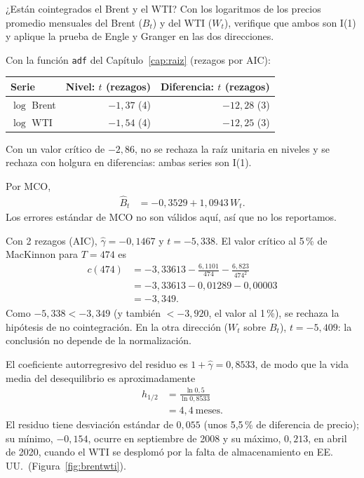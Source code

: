 \begin{ejresuelto}{¿Están cointegrados el Brent y el WTI?}\label{ej:eg}
\enunciado Con los logaritmos de los precios promedio mensuales del Brent ($B_t$) y del WTI ($W_t$), verifique que
ambos son I(1) y aplique la prueba de Engle y Granger en las dos direcciones.

\solucion
{} Con la función \texttt{adf} del Capítulo~\ref{cap:raiz} (rezagos por AIC):
\begin{center}\small
\begin{tabular}{@{}lrr@{}}
\toprule
Serie & Nivel: $t$ (rezagos) & Diferencia: $t$ (rezagos) \\
\midrule
$\log$ Brent & $-1{,}37$ (4) & $-12{,}28$ (3) \\
$\log$ WTI   & $-1{,}54$ (4) & $-12{,}25$ (3) \\
\bottomrule
\end{tabular}
\end{center}
Con un valor crítico de $-2{,}86$, no se rechaza la raíz unitaria en niveles y se rechaza con holgura en
diferencias: ambas series son I(1).

 Por MCO,
\begin{align*}
  \hat B_t &= -0{,}3529+1{,}0943\,W_t .
\end{align*}
Los errores estándar de MCO no son válidos aquí, así que no los reportamos.

 Con 2 rezagos (AIC), $\hat\gamma=-0{,}1467$ y $t=-5{,}338$. El valor crítico
al 5\,\% de MacKinnon para $T=474$ es
\begin{align*}
  c(474) &= -3{,}33613-\frac{6{,}1101}{474}-\frac{6{,}823}{474^2}\\
         &= -3{,}33613-0{,}01289-0{,}00003\\
         &= -3{,}349 .
\end{align*}
Como $-5{,}338<-3{,}349$ (y también $<-3{,}920$, el valor al 1\,\%), se rechaza la hipótesis de no cointegración.
En la otra dirección ($W_t$ sobre $B_t$), $t=-5{,}409$: la conclusión no depende de la normalización.

 El coeficiente autorregresivo del residuo es
$1+\hat\gamma=0{,}8533$, de modo que la vida media del desequilibrio es aproximadamente
\begin{align*}
  h_{1/2} &= \frac{\ln0{,}5}{\ln0{,}8533}\\
          &= 4{,}4\ \text{meses}.
\end{align*}
El residuo tiene desviación estándar de $0{,}055$ (unos 5,5\,\% de diferencia de precio); su mínimo, $-0{,}154$, ocurre
en septiembre de 2008 y su máximo, $0{,}213$, en abril de 2020, cuando el WTI se desplomó por la falta de
almacenamiento en EE.\,UU.\ (Figura~\ref{fig:brentwti}).


\end{ejresuelto}
